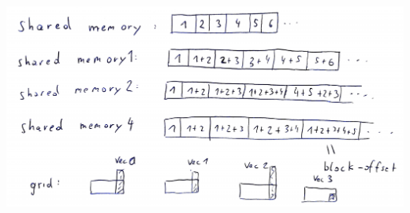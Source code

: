 \documentclass[11pt,a4paper]{article}
\begin{document}
\begin{minipage}[t]{0.5\textwidth}
	\includegraphics[width=\textwidth]{Bilder/Ex5_1_3}
\end{minipage}
\begin{minipage}[t]{0.27\textwidth}

\end{minipage}
\end{document}
